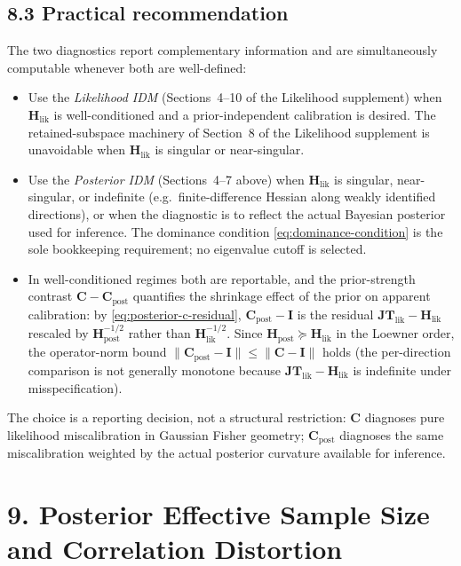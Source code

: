 \documentclass[11pt]{article}
\begin{document}
\subsection*{8.3 Practical recommendation}

The two diagnostics report complementary information and are simultaneously computable whenever both are well-defined:
\begin{itemize}
\item Use the \emph{Likelihood IDM} (Sections~4--10 of the Likelihood supplement) when $\mathbf H_{\mathrm{lik}}$ is well-conditioned and a prior-independent calibration is desired. The retained-subspace machinery of Section~8 of the Likelihood supplement is unavoidable when $\mathbf H_{\mathrm{lik}}$ is singular or near-singular.
\item Use the \emph{Posterior IDM} (Sections~4--7 above) when $\mathbf H_{\mathrm{lik}}$ is singular, near-singular, or indefinite (e.g.\ finite-difference Hessian along weakly identified directions), or when the diagnostic is to reflect the actual Bayesian posterior used for inference. The dominance condition \eqref{eq:dominance-condition} is the sole bookkeeping requirement; no eigenvalue cutoff is selected.
\item In well-conditioned regimes both are reportable, and the prior-strength contrast $\mathbf C - \mathbf C_{\mathrm{post}}$ quantifies the shrinkage effect of the prior on apparent calibration: by \eqref{eq:posterior-c-residual}, $\mathbf C_{\mathrm{post}} - \mathbf I$ is the residual $\mathbf{JT}_{\mathrm{lik}} - \mathbf H_{\mathrm{lik}}$ rescaled by $\mathbf H_{\mathrm{post}}^{-1/2}$ rather than $\mathbf H_{\mathrm{lik}}^{-1/2}$. Since $\mathbf H_{\mathrm{post}} \succeq \mathbf H_{\mathrm{lik}}$ in the Loewner order, the operator-norm bound $\|\mathbf C_{\mathrm{post}} - \mathbf I\| \leq \|\mathbf C - \mathbf I\|$ holds (the per-direction comparison is not generally monotone because $\mathbf{JT}_{\mathrm{lik}} - \mathbf H_{\mathrm{lik}}$ is indefinite under misspecification).
\end{itemize}
The choice is a reporting decision, not a structural restriction: $\mathbf C$ diagnoses pure likelihood miscalibration in Gaussian Fisher geometry; $\mathbf C_{\mathrm{post}}$ diagnoses the same miscalibration weighted by the actual posterior curvature available for inference.



\section*{9. Posterior Effective Sample Size and Correlation Distortion}
\end{document}
